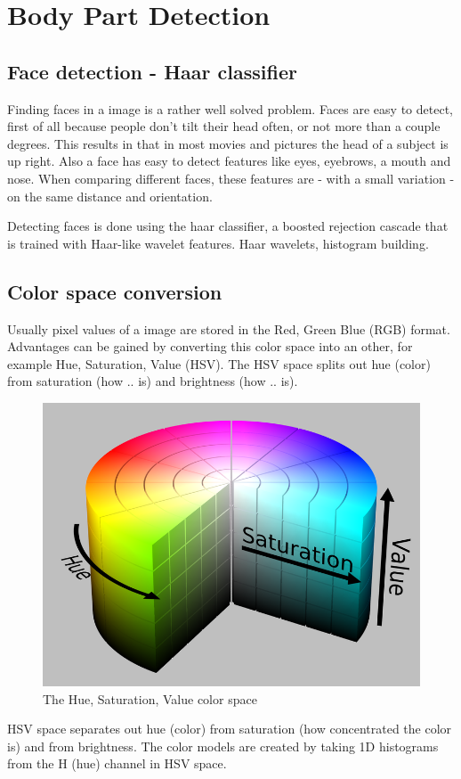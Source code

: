 \chapter{Body Part Detection}
\label{ch:bodyparts}


\section{Face detection - Haar classifier}
Finding faces in a image is a rather well solved problem. Faces are easy to detect, first of all because people don't tilt their head often, or not more than a couple degrees. This results in that in most movies and pictures the head of a subject is up right. Also a face has easy to detect features like eyes, eyebrows, a mouth and nose. When comparing different faces, these features are - with a small variation - on the same distance and orientation.

Detecting faces is done using the haar classifier, a  boosted rejection cascade that is trained with Haar-like wavelet features\cite{Lienhart02anextended}.
Haar wavelets, histogram building.


\section{Color space conversion}
Usually pixel values of a image are stored in the Red, Green Blue (RGB) format. Advantages can be gained by converting this color space into an other, for example Hue, Saturation, Value (HSV). The HSV space splits out hue (color) from saturation (how .. is) and brightness (how .. is).

\begin{figure}[htbp]
	\center
	\includegraphics[width=0.4\linewidth]{figures/hsv.png}
	\caption{The Hue, Saturation, Value color space}
	\label{fig:hsv}
\end{figure}



HSV space separates out hue (color) from saturation (how concentrated the color is) and from brightness. The color models are created by taking 1D histograms from the H (hue) channel in HSV space.


